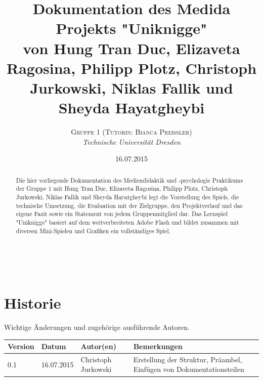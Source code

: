 \documentclass[a4paper, 11pt]{article} %
\title{\textbf{Dokumentation des Medida Projekts "Uniknigge"}\\ %
von Hung Tran Duc, Elizaveta Ragosina, Philipp Plotz, Christoph Jurkowski, Niklas Fallik und Sheyda Hayatgheybi} %
\author{\textsc{Gruppe 1 (Tutorin: Bianca Preißler)} %
\\{\textit{Technische Universität Dresden}}} %
\date{16.07.2015} %
\makeatletter
\renewcommand{\maketitle}{ %
\begin{flushright} %
{\LARGE\@title} %

\vspace{50pt} %

{\large\@author} %
\\\@date %

\vspace{40pt} %
\end{flushright}
}
\makeatother
\begin{document}
\maketitle %


\renewcommand{\abstractname}{Präambel} %

\vspace{5cm} %


\begin{abstract}
\noindent
Die hier vorliegende Dokumentation des Mediendidaktik und -psychologie Praktikums der Gruppe 1 mit Hung Tran Duc, Elizaveta Ragosina, Philipp Plotz, Christoph Jurkowski, Niklas Fallik und Sheyda Hayatgheybi legt die Vorstellung des Spiels, die technische Umsetzung, die Evaluation mit der Zielgruppe, den Projektverlauf
und das eigene Fazit sowie ein Statement von jedem Gruppenmitglied dar. Das Lernspiel "Uniknigge" basiert auf dem weitverbreiteten Adobe Flash und bildet zusammen mit diversen Mini-Spielen und Grafiken ein vollständiges Spiel.
\end{abstract}


\newpage 
\section*{Historie}
Wichtige Änderungen und zugehörige ausführende Autoren.\\
\begin{tabular}{|lllp{5.5cm}|}
\hline 
\textbf{Version} & \textbf{Datum} & \textbf{Autor(en)} & \textbf{Bemerkungen} \\ 
\hline 
0.1 & 16.07.2015 & Christoph Jurkowski & \nohyphens{Erstellung der Struktur, Präambel, Einfügen von Dokumentationsteilen} \\ 
\hline
\end{tabular} 


\end{document}
